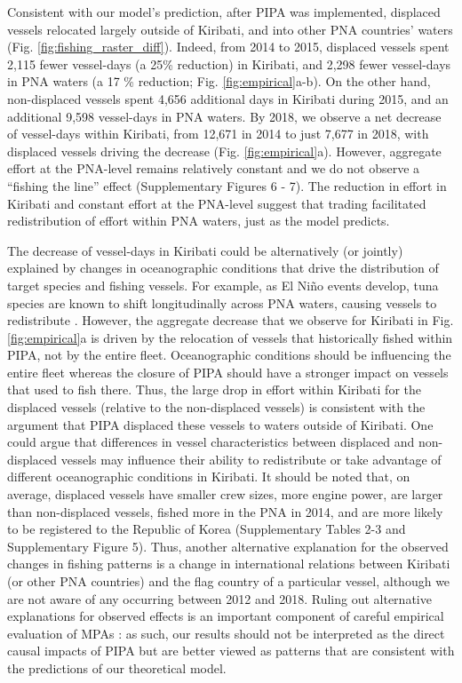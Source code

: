 \documentclass[12pt]{article}
\begin{document}
Consistent with our model's prediction, after PIPA was implemented, displaced vessels relocated largely outside of Kiribati, and into other PNA countries' waters (Fig. \ref{fig:fishing_raster_diff}). Indeed, from 2014 to 2015, displaced vessels spent 2,115 fewer vessel-days (a 25\% reduction) in Kiribati, and 2,298 fewer vessel-days in PNA waters (a 17 \% reduction; Fig. \ref{fig:empirical}a-b). On the other hand, non-displaced vessels spent 4,656 additional days in Kiribati during 2015, and an additional 9,598 vessel-days in PNA waters. By 2018, we observe a net decrease of vessel-days within Kiribati, from 12,671 in 2014 to just 7,677 in 2018, with displaced vessels driving the decrease (Fig. \ref{fig:empirical}a). However, aggregate effort at the PNA-level remains relatively constant and we do not observe a ``fishing the line'' effect (Supplementary Figures 6 - 7). The reduction in effort in Kiribati and constant effort at the PNA-level suggest that trading facilitated redistribution of effort within PNA waters, just as the model predicts.

The decrease of vessel-days in Kiribati could be alternatively (or jointly) explained by changes in oceanographic conditions that drive the distribution of target species and fishing vessels. For example, as El Ni\~no events develop, tuna species are known to shift longitudinally across PNA waters, causing vessels to redistribute \cite{aqorau_2018,hanich2018unraveling}. However, the aggregate decrease that we observe for Kiribati in Fig. \ref{fig:empirical}a is driven by the relocation of vessels that historically fished within PIPA, not by the entire fleet. Oceanographic conditions should be influencing the entire fleet whereas the closure of PIPA should have a stronger impact on vessels that used to fish there. Thus, the large drop in effort within Kiribati for the displaced vessels (relative to the non-displaced vessels) is consistent with the argument that PIPA displaced these vessels to waters outside of Kiribati. One could argue that differences in vessel characteristics between displaced and non-displaced vessels may influence their ability to redistribute or take advantage of different oceanographic conditions in Kiribati. It should be noted that, on average, displaced vessels have smaller crew sizes, more engine power, are larger than non-displaced vessels, fished more in the PNA in 2014, and are more likely to be registered to the Republic of Korea (Supplementary Tables 2-3 and Supplementary Figure 5). Thus, another alternative explanation for the observed changes in fishing patterns is a change in international relations between Kiribati (or other PNA countries) and the flag country of a particular vessel, although we are not aware of any occurring between 2012 and 2018. Ruling out alternative explanations for observed effects is an important component of careful empirical evaluation of MPAs \cite{ferraro2018causal}: as such, our results should not be interpreted as the direct causal impacts of PIPA but are better viewed as patterns that are consistent with the predictions of our theoretical model.
\end{document}
